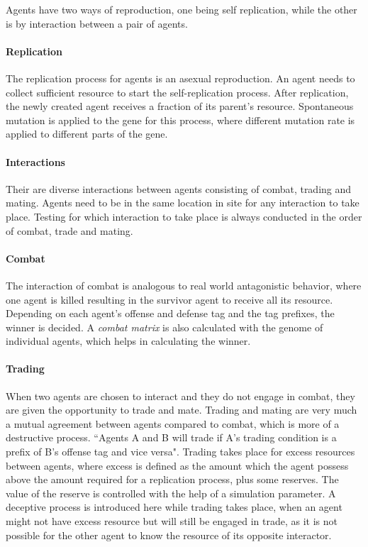 Agents have two ways of reproduction, one being self replication, while the other is by interaction between a pair of agents. 

\paragraph{Replication}
The replication process for agents is an asexual reproduction. An agent needs to collect sufficient resource to start the self-replication process. After replication, the newly created agent receives a fraction of its parent's resource. Spontaneous mutation is applied to the gene for this process, where different mutation rate is applied to different parts of the gene. 

\paragraph{Interactions}
Their are diverse interactions between agents consisting of combat, trading and mating. Agents need to be in the same location in site for any interaction to take place. Testing for which interaction to take place is always conducted in the order of combat, trade and mating. 

\paragraph{Combat}
The interaction of combat is analogous to real world antagonistic behavior, where one agent is killed resulting in the survivor agent to receive all its resource. Depending on each agent's offense and defense tag and the tag prefixes, the winner is decided. A \textsl{combat matrix} is also calculated with the genome of individual agents, which helps in calculating the winner.

\paragraph{Trading}
When two agents are chosen to interact and they do not engage in combat, they are given the opportunity to trade and mate. Trading and mating are very much a mutual agreement between agents compared to combat, which is more of a destructive process. ``Agents A and B will trade if A's trading condition is a prefix of B's offense tag and vice versa". Trading takes place for excess resources between agents, where excess is defined as the amount which the agent possess above the amount required for a replication process, plus some reserves. The value of the reserve is controlled with the help of a simulation parameter. A deceptive process is introduced here while trading takes place, when an agent might not have excess resource but will still be engaged in trade, as it is not possible for the other agent to know the resource of its opposite interactor. 

